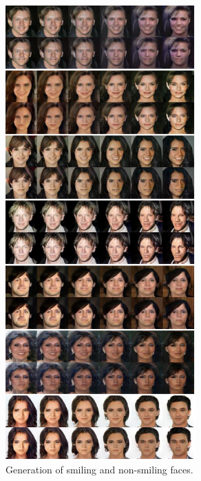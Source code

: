 \begin{figure}[thb!]
\centering
\includegraphics[trim=0in 0in 0in 0in, width=0.65\textwidth]{result_face_smiling_big3.pdf}
\caption{Generation of smiling and non-smiling faces.}
\label{fig::result_smiling3}
\end{figure}
